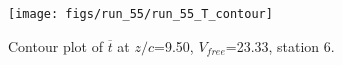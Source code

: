 \begin{figure}[H]
\centering
\texttt{[image: figs/run\_55/run\_55\_T\_contour]}
\caption{Contour plot of $\overline{t}$ at $z/c$=9.50, $V_{free}$=23.33, station 6.}
\label{fig:run_55_T_contour}
\end{figure}


